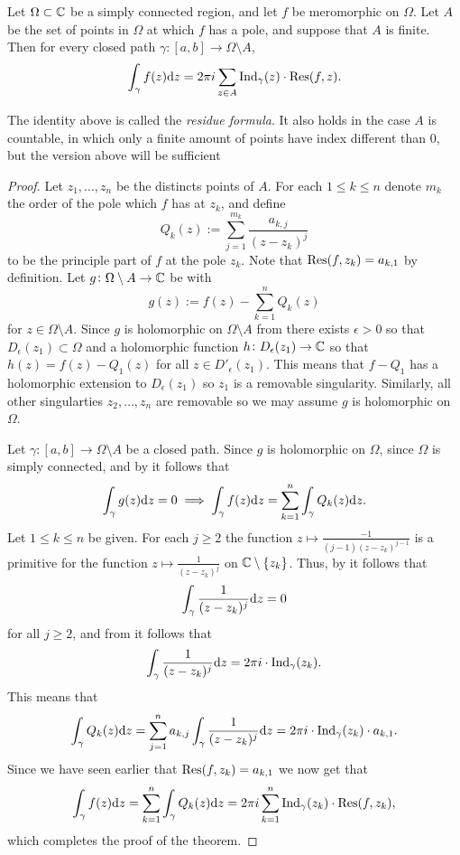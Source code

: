 \documentclass[11pt,a4paper]{article}
\begin{document}
\begin{theorem}
  \label{thm:residue-theorem}
  Let $\Omega \subset \mathbb{C}$ be a simply connected region,
  and let $f$ be meromorphic on $\Omega$.
  Let $A$ be the set of points in $\Omega$ at which $f$ has a pole,
  and suppose that $A$ is finite.
  Then for every closed path $\gamma \colon [a,b] \to \Omega \setminus A$,
  \[
    \int_{\gamma} f(z) \mathrm{d} z =
    2 \pi i \sum_{z \in A} \operatorname{Ind}_{\gamma}(z) \cdot \operatorname{Res}(f,z).
  \]
\end{theorem}
\begin{remark}
  The identity above is called the \textit{residue formula}.
  It also holds in the case $A$ is countable,
  in which only a finite amount of points have index different than $0$,
  but the version above will be sufficient
\end{remark}
\begin{proof}
  Let $z_1,\dots,z_n$ be the distincts points of $A$.
  For each $1 \le k \le n$ denote $m_k$ the order of the pole which $f$
  has at $z_k$, and define
  \[
    Q_k(z) := \sum_{j=1}^{m_k} \frac{a_{k,j}}{(z - z_k)^j}
  \]
  to be the principle part of $f$ at the pole $z_k$.
  Note that $\operatorname{Res}(f,z_k) = a_{k,1}$ by definition.
  Let $g \colon \Omega \setminus A \to \mathbb{C}$ be with
  \[
    g(z) := f(z) - \sum_{k=1}^{n} Q_k(z)
  \]
  for $z \in \Omega \setminus A$.
  Since $g$ is holomorphic on $\Omega \setminus A$ from 
  there exists $\epsilon > 0$ so that $D_{\epsilon}(z_1) \subset \Omega$ and a
  holomorphic function $h \colon D_{\epsilon}(z_1) \to \mathbb{C}$ so that
  $h(z) = f(z) - Q_1(z)$ for all $z \in D'_{\epsilon}(z_1)$.
  This means that $f - Q_1$ has a holomorphic extension to $D_{\epsilon}(z_1)$
  so $z_1$ is a removable singularity.
  Similarly, all other singularties $z_2,\dots,z_n$ are removable so we may
  assume $g$ is holomorphic on $\Omega$.

  Let $\gamma \colon [a,b] \to \Omega \setminus A$ be a closed path.
  Since $g$ is holomorphic on $\Omega$,
  since $\Omega$ is simply connected,
  and by  it follows that
  \[
    \int_{\gamma} g(z) \mathrm{d} z = 0 \implies
    \int_{\gamma} f(z) \mathrm{d} z = \sum_{k=1}^{n} \int_{\gamma} Q_k(z) \mathrm{d} z.
  \]
  Let $1 \le k \le n$ be given.
  For each $j \geq 2$ the function $z \mapsto \frac{-1}{(j-1)(z-z_k)^{j-1}}$
  is a primitive for the function $z \mapsto \frac{1}{(z-z_k)^{j}}$ on
  $\mathbb{C} \setminus \left\{z_k\right\}$.
  Thus, by  it follows that
  \[
    \int_{\gamma} \frac{1}{(z-z_k)^{j}} \mathrm{d} z = 0
  \]
  for all $j \geq 2$, and from  it follows that
  \[
    \int_{\gamma} \frac{1}{(z-z_k)^{j}} \mathrm{d} z =
    2 \pi i \cdot \operatorname{Ind}_{\gamma}(z_k).
  \]
  This means that
  \[
    \int_{\gamma} Q_k(z) \mathrm{d} z =
    \sum_{j=1}^{n} a_{k,j} \int_{\gamma} \frac{1}{(z-z_k)^{j}} \mathrm{d} z =
    2 \pi i \cdot \operatorname{Ind}_{\gamma}(z_k) \cdot a_{k,1}.
  \]
  Since we have seen earlier that $\operatorname{Res}(f,z_k) = a_{k,1}$ we now get
  that
  \[
    \int_{\gamma} f(z) \mathrm{d} z =
    \sum_{k=1}^{n} \int_{\gamma} Q_k(z) \mathrm{d} z =
    2 \pi i \sum_{k=1}^{n} \operatorname{Ind}_{\gamma}(z_k) \cdot \operatorname{Res}(f,z_k),
  \]
  which completes the proof of the theorem.
\end{proof}
\end{document}
